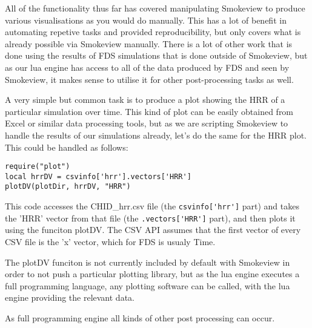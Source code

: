 \documentclass[11pt,twoside]{book}
\begin{document}
All of the functionality thus far has covered manipulating Smokeview to produce
various visualisations as you would do manually. This has a lot of benefit in
automating repetive tasks and provided reproducibility, but only covers what is
already possible via Smokeview manually. There is a lot of other work that is
done using the results of FDS simulations that is done outside of Smokeview, but
as our lua engine has access to all of the data produced by FDS and seen by
Smokeview, it makes sense to utilise it for other post-processing tasks as well.

A very simple but common task is to produce a plot showing the HRR of a
particular simulation over time. This kind of plot can be easily obtained from
Excel or similar data processing tools, but as we are scripting Smokeview to
handle the results of our simulations already, let's do the same for the HRR
plot. This could be handled as follows:

\begin{lstlisting}[style=lua]
require("plot")
local hrrDV = csvinfo['hrr'].vectors['HRR']
plotDV(plotDir, hrrDV, "HRR")
\end{lstlisting}

This code accesses the CHID\_hrr.csv file (the \lstinline{csvinfo['hrr']} part)
and takes the 'HRR' vector from that file (the \lstinline{.vectors['HRR']}
part), and then plots it using the funciton plotDV. The CSV API assumes that the
first vector of every CSV file is the 'x' vector, which for FDS is usualy Time.

The plotDV funciton is not currently included by default with Smokeview in order
to not push a particular plotting library, but as the lua engine executes a full
programming language, any plotting software can be called, with the lua engine
providing the relevant data.

As full programming engine all kinds of other post processing can occur.
\end{document}
